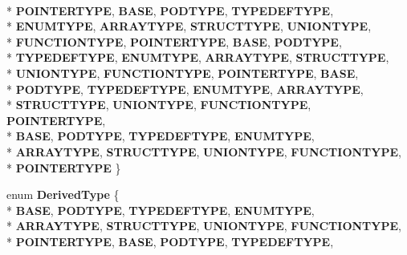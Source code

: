\begin{DoxyCompactItemize}
\\*
{\bfseries P\-O\-I\-N\-T\-E\-R\-T\-Y\-P\-E}, 
{\bfseries B\-A\-S\-E}, 
{\bfseries P\-O\-D\-T\-Y\-P\-E}, 
{\bfseries T\-Y\-P\-E\-D\-E\-F\-T\-Y\-P\-E}, 
\\*
{\bfseries E\-N\-U\-M\-T\-Y\-P\-E}, 
{\bfseries A\-R\-R\-A\-Y\-T\-Y\-P\-E}, 
{\bfseries S\-T\-R\-U\-C\-T\-T\-Y\-P\-E}, 
{\bfseries U\-N\-I\-O\-N\-T\-Y\-P\-E}, 
\\*
{\bfseries F\-U\-N\-C\-T\-I\-O\-N\-T\-Y\-P\-E}, 
{\bfseries P\-O\-I\-N\-T\-E\-R\-T\-Y\-P\-E}, 
{\bfseries B\-A\-S\-E}, 
{\bfseries P\-O\-D\-T\-Y\-P\-E}, 
\\*
{\bfseries T\-Y\-P\-E\-D\-E\-F\-T\-Y\-P\-E}, 
{\bfseries E\-N\-U\-M\-T\-Y\-P\-E}, 
{\bfseries A\-R\-R\-A\-Y\-T\-Y\-P\-E}, 
{\bfseries S\-T\-R\-U\-C\-T\-T\-Y\-P\-E}, 
\\*
{\bfseries U\-N\-I\-O\-N\-T\-Y\-P\-E}, 
{\bfseries F\-U\-N\-C\-T\-I\-O\-N\-T\-Y\-P\-E}, 
{\bfseries P\-O\-I\-N\-T\-E\-R\-T\-Y\-P\-E}, 
{\bfseries B\-A\-S\-E}, 
\\*
{\bfseries P\-O\-D\-T\-Y\-P\-E}, 
{\bfseries T\-Y\-P\-E\-D\-E\-F\-T\-Y\-P\-E}, 
{\bfseries E\-N\-U\-M\-T\-Y\-P\-E}, 
{\bfseries A\-R\-R\-A\-Y\-T\-Y\-P\-E}, 
\\*
{\bfseries S\-T\-R\-U\-C\-T\-T\-Y\-P\-E}, 
{\bfseries U\-N\-I\-O\-N\-T\-Y\-P\-E}, 
{\bfseries F\-U\-N\-C\-T\-I\-O\-N\-T\-Y\-P\-E}, 
{\bfseries P\-O\-I\-N\-T\-E\-R\-T\-Y\-P\-E}, 
\\*
{\bfseries B\-A\-S\-E}, 
{\bfseries P\-O\-D\-T\-Y\-P\-E}, 
{\bfseries T\-Y\-P\-E\-D\-E\-F\-T\-Y\-P\-E}, 
{\bfseries E\-N\-U\-M\-T\-Y\-P\-E}, 
\\*
{\bfseries A\-R\-R\-A\-Y\-T\-Y\-P\-E}, 
{\bfseries S\-T\-R\-U\-C\-T\-T\-Y\-P\-E}, 
{\bfseries U\-N\-I\-O\-N\-T\-Y\-P\-E}, 
{\bfseries F\-U\-N\-C\-T\-I\-O\-N\-T\-Y\-P\-E}, 
\\*
{\bfseries P\-O\-I\-N\-T\-E\-R\-T\-Y\-P\-E}
 \}
\item 
enum {\bfseries Derived\-Type} \{ \\*
{\bfseries B\-A\-S\-E}, 
{\bfseries P\-O\-D\-T\-Y\-P\-E}, 
{\bfseries T\-Y\-P\-E\-D\-E\-F\-T\-Y\-P\-E}, 
{\bfseries E\-N\-U\-M\-T\-Y\-P\-E}, 
\\*
{\bfseries A\-R\-R\-A\-Y\-T\-Y\-P\-E}, 
{\bfseries S\-T\-R\-U\-C\-T\-T\-Y\-P\-E}, 
{\bfseries U\-N\-I\-O\-N\-T\-Y\-P\-E}, 
{\bfseries F\-U\-N\-C\-T\-I\-O\-N\-T\-Y\-P\-E}, 
\\*
{\bfseries P\-O\-I\-N\-T\-E\-R\-T\-Y\-P\-E}, 
{\bfseries B\-A\-S\-E}, 
{\bfseries P\-O\-D\-T\-Y\-P\-E}, 
{\bfseries T\-Y\-P\-E\-D\-E\-F\-T\-Y\-P\-E}, 

\end{DoxyCompactItemize}
